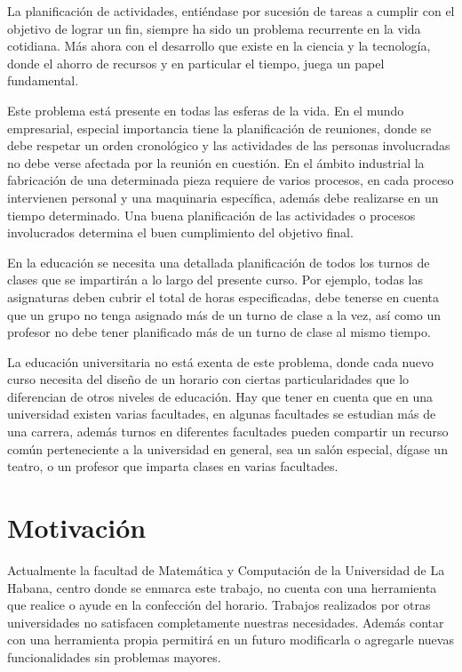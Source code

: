 \begin{introduction}

La planificación de actividades, entiéndase por sucesión de tareas a cumplir
con el objetivo de lograr un fin, siempre ha sido un problema recurrente en la
vida cotidiana. Más ahora con el desarrollo que existe en la ciencia y la tecnología,
donde el ahorro de recursos y en particular el tiempo, juega un papel fundamental.

Este problema está presente en todas las esferas de la vida. En el mundo empresarial,
especial importancia tiene la planificación de reuniones, donde se debe respetar un
orden cronológico y las actividades de las personas involucradas no debe verse afectada
por la reunión en cuestión. En el ámbito industrial la fabricación de una determinada
pieza requiere de varios procesos, en cada proceso intervienen personal y una maquinaria
específica, además debe realizarse en un tiempo determinado. Una buena planificación
de las actividades o procesos involucrados determina el buen cumplimiento del objetivo
final.

En la educación se necesita una detallada planificación de todos los turnos de clases que se
impartirán a lo largo del presente curso. Por ejemplo, todas las asignaturas deben cubrir el total de horas
especificadas, debe tenerse en cuenta que un grupo no tenga asignado más de un turno de clase
a la vez, as\'i como un profesor no debe tener planificado más de un turno de clase al mismo tiempo.

La educación universitaria no está exenta de este problema, donde cada nuevo curso necesita del
diseño de un horario con ciertas particularidades que lo diferencian de otros niveles de educación.
Hay que tener en cuenta que en una universidad existen varias facultades, en algunas facultades se
estudian más de una carrera, además turnos en diferentes facultades pueden compartir un recurso común
perteneciente a la universidad en general, sea un salón especial, d\'igase un teatro, o un profesor
que imparta clases en varias facultades.

\section*{Motivación}

Actualmente la facultad de Matemática y Computación de la Universidad de La Habana, centro donde 
se enmarca este trabajo, no cuenta con una herramienta que realice o ayude en la confección del horario.
Trabajos realizados por otras universidades no satisfacen completamente nuestras necesidades.
Además contar con una herramienta propia permitirá en un futuro modificarla o agregarle nuevas
funcionalidades sin problemas mayores.


\end{introduction}
